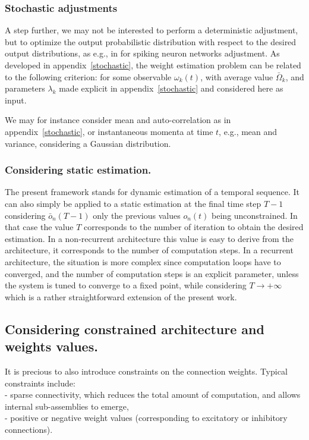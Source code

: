 \subsubsection*{Stochastic adjustments} A step further, we may not be interested to perform a deterministic adjustment, but to optimize the output probabilistic distribution with respect to the desired output distributions, as e.g., in \cite{cofre:hal-00861397} for spiking neuron networks adjustment. As developed in appendix~\ref{stochastic}, the weight estimation problem can be related to the following criterion:
for some observable $\omega_k(t)$, with average value $\bar{\Omega}_{k}$, and parameters $\lambda_k$ made explicit in appendix~\ref{stochastic} and considered here as input.

We may for instance consider mean and auto-correlation as in appendix~\ref{stochastic}, or instantaneous momenta at time $t$, e.g., mean and variance, considering a Gaussian distribution.

\subsubsection*{Considering static estimation.}

The present framework stands for dynamic estimation of a temporal sequence. It can also simply be applied to a static estimation at the final time step $T-1$ considering $\bar{o}_n(T-1)$ only the previous values $o_n(t)$ being unconstrained. In that case the value $T$ corresponds to the number of iteration to obtain the desired estimation. In a non-recurrent architecture this value is easy to derive from the architecture, it corresponds to the number of computation steps. In a recurrent architecture, the situation is more complex since computation loops have to converged, and the number of computation steps is an explicit parameter, unless the system is tuned to converge to a fixed point, while considering $T \rightarrow +\infty$ which is a rather straightforward extension of the present work.

\subsection*{Considering constrained architecture and weights values.}

It is precious to also introduce constraints on the connection weights. Typical constraints include: 
\\- sparse connectivity, which reduces the total amount of computation, and allows internal sub-assemblies to emerge, 
\\- positive or negative weight values (corresponding to excitatory or inhibitory connections).

